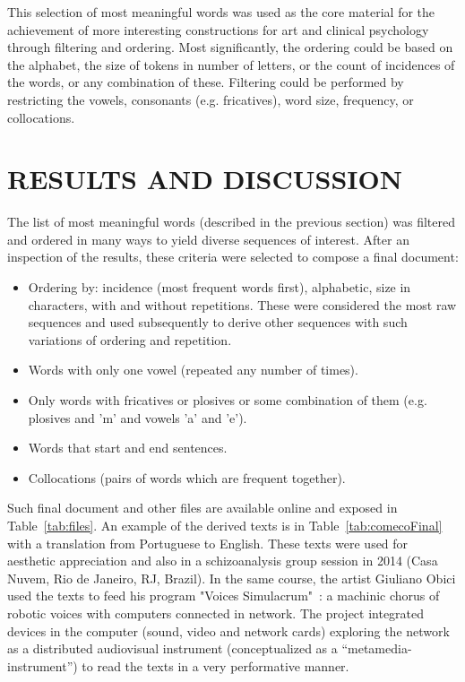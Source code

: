 \documentclass[12pt,fleqn]{article}
\begin{document}
This selection of most meaningful words was used as the core material for the achievement
of more interesting constructions for
art and clinical psychology  through filtering and ordering.
Most significantly, the ordering could be based on the alphabet, the size of tokens in number of letters,
or the count of incidences of the words, or any combination of these.
Filtering could be performed by restricting the vowels, consonants (e.g. fricatives), word size, frequency, or
collocations.

\section{RESULTS AND DISCUSSION}\label{sec:res}
The list of most meaningful words (described in the previous section) was filtered and ordered
in many ways to yield diverse sequences of interest.
After an inspection of the results, these criteria were selected to compose a final document:
\begin{itemize}
	\item Ordering by: incidence (most frequent words first),
alphabetic, size in characters, with and without repetitions.
These were considered the most raw sequences and used subsequently to derive other sequences
		with such variations of ordering and repetition.
	\item Words with only one vowel (repeated any number of times).
	\item Only words with fricatives or plosives or
some combination of them (e.g. plosives and 'm' and vowels 'a' and 'e').
	\item Words that start and end sentences.
	\item Collocations (pairs of words which are frequent together).
\end{itemize}

Such final document and other files are available online and exposed in Table~\ref{tab:files}.
An example of the derived texts is in Table~\ref{tab:comecoFinal} with a translation
from Portuguese to English.
These texts were used for aesthetic appreciation and also in a schizoanalysis group session
in 2014 (Casa Nuvem, Rio de Janeiro, RJ, Brazil).
In the same course, the artist Giuliano Obici used the texts to feed his program "Voices Simulacrum"~\citep{obici}: a machinic chorus of robotic voices with computers connected in network. The project integrated devices in the computer (sound, video and network cards) exploring the network as a distributed audiovisual instrument (conceptualized as a ``metamedia-instrument'')
to read the texts in a very performative manner.
\end{document}
